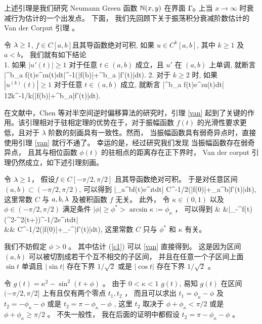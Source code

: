  上述引理是我们研究 Neumann Green 函数 $\mathbb{N}(x,y)$ 在界面 $\Gamma_0$ 上当 $x\to\infty$ 时衰减行为估计的一个出发点。 下面， 我们先回顾下关于振荡积分衰减阶数估计的 Van der Corput 引理 \cite[P.152]{grafakos} 。
 
 \begin{lem}\label{van}
 	令 $\lambda\ge 1$, $f\in C[a,b]$且其导函数绝对可积, 如果 $u\in C^k[a,b]$, 其中 $k\ge 1$ 及 $a<b$， 我们就有如下结论 \\
 	{\rm 1}. 如果 $|u'(t)|\ge 1$ 对于任意 $t\in (a,b)$ 成立，且 $u'$ 在 $(a,b)$ 上单调, 就断言
 	\ben
 	\left|\int^b_a f(t)e^{\i\lambda u(t)}dt\right|\lambda^{-1}\left(|f(b)|+\int^b_a |f'(t)|dt\right).
 	\een
 	{\rm 2}. 对于 $k\geq2$ 时, 如果 $|u^{(k)}(t)|\ge 1$ 对于任意 $t\in (a,b)$ 成立, 就断言 
 	\ben
 	\left|\int^b_a f(t)e^{\i\lambda u(t)}dt\right|\le
 	12k\lambda^{-1/k}\left(|f(b)|+\int^b_a|f'(t)|dt\right).
 	\een
 \end{lem}

在文献\cite{RTMhalf_aco}中，Chen 等对半空间逆时偏移算法的研究时，引理 \ref{van} 起到了关键的作用。该引理相对于驻相定理的优势在于，对于振幅函数 $f(t)$ 的光滑性要求更低，且对于 $\lambda$ 阶数的刻画具有一致性。然而， 当振幅函数具有弱奇异点时，直接使用引理 \ref{van} 就行不通了。 幸运的是，经过研究我们发现 当振幅函数存在弱奇异点， 且其与相位函数 $\phi(t)$ 的驻相点的距离存在正下界时， Van der corput 引理仍然成立，如下述引理刻画。


\begin{lem}\label{lem:2.5}
	令 $\lambda\ge 1$， 假设$f\in C[-\pi/2,\pi/2]$ 且其导函数绝对可积。 于是对任意区间 $(a,b)\subset (-\pi/2,\pi/2)$, 可以得到
	\be\label{c1}
	\left|\int_a^bf(t)e^{\i\lam\cos t}dt\right| 
	\leq C\lam^{-1/2}\left(|f(0)|+\int_a^b|f'(t)|dt\right),
	\ee
	这里常数 $C$ 与 $a,b,\lambda$ 及被积函数 $f$ 无关。 
	此外， 令 $\kappa\in (0,1)$ 以及 $\phi\in (-\pi/2,\pi/2)$ 满足条件 $|\phi|\geq\phi^*>\arcsin \kappa:=\phi_\kappa$ ， 可以得到
	\be\label{c3}
	 & &\left|\int_{-\frac{}}^{\frac{}}f(t)(\kappa^2-\sin^2(t+\phi))^{-1/2}e^{\i\lam\cos t}dt\right|  \\ \nn
	&\leq& C\lam^{-1/2}\left(|f(0)|+\int_{-\frac{}}^{\frac {}}|f'(t)|dt\right),
	\ee
	这里常数 $C$ 只与 $\phi^*$ 和 $\kappa$ 有关。
\end{lem}
\debproof
我们不妨假定 $\phi>0$ 。
其中估计 (\ref{c1}) 可以 \ref{van} 直接得到。 这是因为区间 $(a,b)$ 可以被切割成若干个互不相交的子区间， 并且在任意一个子区间上面 $\sin t$ 单调且 $|\sin t|$ 存在下界 $1/\sqrt 2$ 或是 $|\cos t|$ 存在下界 $1/\sqrt 2$ 。

令 $g(t)=\kappa^2-\sin^2(t+\phi)$ 。 由于 $0<\kappa<1$ $g(t)$, 易知 $g(t)$ 在区间 $(-\pi/2,\pi/2]$ 上有且仅有两个零点 $t_1, t_2$ ， 而且可以求出
$t_1=\phi_\kappa-\phi$ 及 $t_2=-\phi_\kappa-\phi$ 或是 $t_2=\pi-\phi_\kappa-\phi$ , 这里 $t_2$ 取决于 $\phi+\phi_\kappa<\pi/2$ 或是 $\phi+\phi_\kappa\ge \pi/2$ 。 不失一般性， 我在后面的证明中都假设 $t_2=\pi-\phi_\kappa-\phi$ 。

